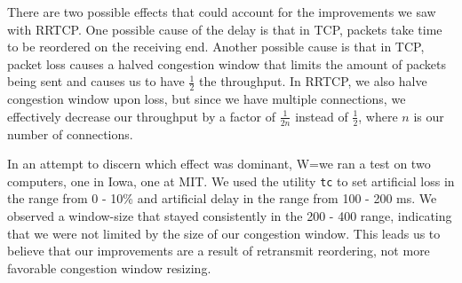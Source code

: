 \documentclass[12pt,letter]{article}
\begin{document}
There are two possible effects that could account for the improvements we saw with RRTCP. One possible cause of the delay is that in TCP, packets take time to be reordered on the receiving end. Another possible cause is that in TCP, packet loss causes a halved congestion window that limits the amount of packets being sent and causes us to have $\frac{1}{2}$ the throughput. In RRTCP, we also halve congestion window upon loss, but since we have multiple connections, we effectively decrease our throughput by a factor of $\frac{1}{2n}$ instead of $\frac{1}{2}$, where $n$ is our number of connections.


In an attempt to discern which effect was dominant, W=we ran a test on two computers, one in Iowa, one at MIT. We used the utility \texttt{tc} to set artificial loss in the range from 0 - 10\% and artificial delay in the range from 100 - 200 ms. We observed a window-size that stayed consistently in the 200 - 400 range, indicating that we were not limited by the size of our congestion window. This leads us to believe that our improvements are a result of retransmit reordering, not more favorable congestion window resizing.
\end{document}
